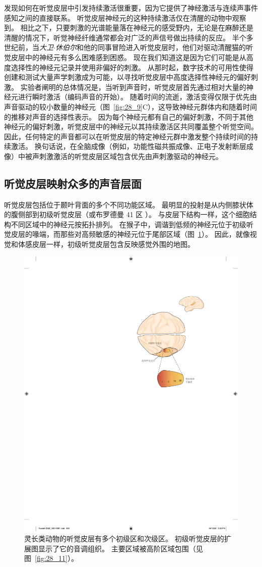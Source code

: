 发现如何在听觉皮层中引发持续激活很重要，因为它提供了神经激活与连续声事件感知之间的直接联系。
听觉皮层神经元的这种持续激活仅在清醒的动物中观察到。
相比之下，只要刺激的光谱能量落在神经元的感受野内，无论是在麻醉还是清醒的情况下，听觉神经纤维通常都会对广泛的声信号做出持续的反应。
半个多世纪前，当\textit{大卫$\cdot$休伯尔}和他的同事冒险进入听觉皮层时，他们对驱动清醒猫的听觉皮层中的神经元有多么困难感到困惑。
现在我们知道这是因为它们可能是从高度选择性的神经元记录并使用非偏好的刺激。
从那时起，数字技术的可用性使得创建和测试大量声学刺激成为可能，以寻找听觉皮层中高度选择性神经元的偏好刺激。
实验者阐明的总体情况是，当听到声音时，听觉皮层首先通过相对大量的神经元进行瞬时激活（编码声音的开始）。
随着时间的流逝，激活变得仅限于优先由声音驱动的较小数量的神经元（图~\ref{fig:28_9}C），这导致神经元群体内和随着时间的推移对声音的选择性表示。
因为每个神经元都有自己的偏好刺激，不同于其他神经元的偏好刺激，听觉皮层中的神经元以其持续激活区共同覆盖整个听觉空间。
因此，任何特定的声音都可以在听觉皮层的特定神经元群中激发整个持续时间的持续激活。
换句话说，在全脑成像（例如，功能性磁共振成像、正电子发射断层成像）中被声刺激激活的听觉皮层区域包含优先由声刺激驱动的神经元。



\subsection{听觉皮层映射众多的声音层面}

听觉皮层包括位于颞叶背面的多个不同功能区域。
最明显的投射是从内侧膝状体的腹侧部到初级听觉皮层（或布罗德曼 41 区 ）。
与皮层下结构一样，这个细胞结构不同区域中的神经元按拓扑排列。
在猴子中，调谐到低频的神经元位于初级听觉皮层的喙端，而那些对高频敏感的神经元位于尾部区域（图~\ref{fig:28_10}）。
因此，就像视觉和体感皮层一样，初级听觉皮层包含反映感觉外围的地图。


\begin{figure}[htbp]
	\centering
	\includegraphics[width=0.6\linewidth]{chap28/fig_28_10}
	\caption{灵长类动物的听觉皮层有多个初级区和次级区。 
		初级听觉皮层的扩展图显示了它的音调组织。
		主要区域被高阶区域包围（见图~\ref{fig:28_11}）。}
	\label{fig:28_10}
\end{figure}


